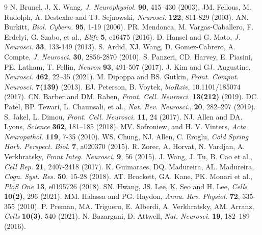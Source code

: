 \documentclass[%
 aip,
 amsmath,amssymb,
 reprint,%
]{revtex4-1}
\begin{document}
\begin{thebibliography}{9}
		 N. Brunel, J. X. Wang, \textit{J. Neurophysiol.} \textbf{90}, 415–430 (2003).
		 JM. Fellous, M. Rudolph, A. Destexhe and TJ. Sejnowski, \textit{Neurosci.} \textbf{122}, 811-829 (2003).
		 AN. Burkitt, \textit{Biol. Cybern.} \textbf{95}, 1-19 (2006).
		 PR. Mendonca, M. Vargas-Caballero, F. Erdelyi, G. Szabo, et al., \textit{Elife} \textbf{5}, e16475 (2016).
		 D. Hansel and G. Mato, \textit{J. Neurosci.} \textbf{33}, 133-149 (2013).
		 S. Ardid, XJ. Wang, D. Gomez-Cabrero, A. Compte, \textit{J. Neurosci.} \textbf{30}, 2856-2870 (2010).
		 S. Panzeri, CD. Harvey, E. Piasini, PE. Latham, T. Fellin, \textit{Neuron} \textbf{93}, 491-507 (2017).
		 J. Kim and GJ. Augustine, \textit{Neurosci.} \textbf{462}, 22–35 (2021).
		 M. Dipoppa and BS. Gutkin, \textit{Front. Comput. Neurosci.} \textbf{7(139)} (2013).
		 EJ. Peterson, B. Voytek, \textit{bioRxiv}, 10.1101/185074 (2017).
		 CN. Barber and DM. Raben, \textit{Front. Cell. Neurosci.} \textbf{13(212)} (2019).
		 DC. Patel, BP. Tewari, L. Chaunsali, et al., \textit{Nat. Rev. Neurosci.}, \textbf{20}, 282–297 (2019).
		 S. Jakel, L. Dimou, \textit{Front. Cell. Neurosci.} \textbf{11}, 24 (2017).
		 NJ. Allen and DA. Lyons, \textit{Science} \textbf{362}, 181–185 (2018).
		 MV. Sofroniew, and H. V. Vinters, \textit{Acta Neuropathol.} \textbf{119}, 7-35 (2010). 
		 WS. Chung, NJ. Allen, C. Eroglu, \textit{Cold Spring Harb. Perspect. Biol.} \textbf{7}, a020370 (2015).
		 R. Zorec, A. Horvat, N. Vardjan, A. Verkhratsky, \textit{Front Integ. Neurosci.} \textbf{9}, 56 (2015).
		 J. Wang, J. Tu, B. Cao et al., \textit{Cell Rep.} \textbf{21}, 2407-2418 (2017).
		 K. Guimaraes, DQ. Madureira, AL. Madureira, \textit{Cogn. Syst. Res.} \textbf{50}, 15-28 (2018).
		 AT. Brockett, GA. Kane, PK. Monari et al., \textit{PloS One} \textbf{13}, e0195726 (2018).
		 SN. Hwang, JS. Lee, K. Seo and H. Lee, \textit{Cells} \textbf{10(2)}, 296 (2021).
		 MM. Halassa and PG. Haydon, \textit{Annu. Rev. Physiol.} \textbf{72}, 335-355 (2010).
		 P. Preman, MA. Triguero, E. Alberdi, A. Verkhratsky, AM. Arranz, \textit{Cells} \textbf{10(3)}, 540 (2021).
		  N. Bazargani, D. Attwell,  \textit{Nat. Neurosci.} \textbf{19}, 182–189 (2016).

\end{thebibliography}
\end{document}
